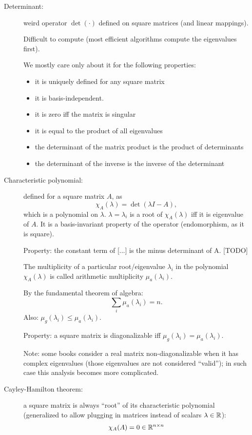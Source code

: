 \documentclass[
  12pt,
  paper=a4,
]{scrartcl} %
\begin{document}
\begin{description}
\item[Determinant:] weird operator $\det(\cdot)$ defined on square matrices (and linear mappings).

Difficult to compute (most efficient algorithms compute the eigenvalues first).

We mostly care only about it for the following properties:
\begin{itemize}
    \item it is uniquely defined for any square matrix
    \item it is basis-independent.
    \item it is zero iff the matrix is singular
    \item it is equal to the product of all eigenvalues
    \item the determinant of the matrix product is the product of determinants
    \item the determinant of the inverse is the inverse of the determinant
\end{itemize}

\item[Characteristic polynomial:] defined for a square matrix $A$, as \[\chi_A(\lambda) = {\det}(\lambda I - A),\] which is a polynomial on $\lambda$. $\lambda=\lambda_i$ is a root of $\chi_A(\lambda)$ iff it is eigenvalue of $A$. It is a basis-invariant property of the operator (endomorphism, as it is square).

Property: the constant term of [...] is  the minus  determinant of A. [TODO]

The multiplicity of a particular root/eigenvalue $\lambda_i$ in the polynomial $\chi_A(\lambda)$  is called arithmetic multiplicity $\mu_a(\lambda_i)$.

By the fundamental theorem of algebra: \[\sum_i \mu_a(\lambda_i) =n.\]
Also: $\mu_g(\lambda_i) \le \mu_a(\lambda_i)$.

Property: a square matrix is diagonalizable iff $\mu_g(\lambda_i) = \mu_a(\lambda_i)$.

Note: some books consider a real matrix non-diagonalizable when it has complex eigenvalues (those eigenvalues are not considered ``valid''); in such case this analysis becomes more complicated.

\newpage
\item[Cayley-Hamilton theorem:] a square matrix is always ``root'' of its characteristic polynomial (generalized to allow plugging in matrices instead of scalars $\lambda\in\mathbb R$):\[
\chi_A(A) = 0 \in \mathbb R^{n\times n}
\]


\end{description}
\end{document}
